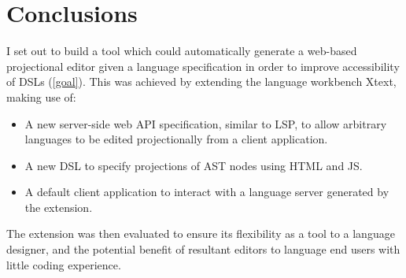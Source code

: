 \documentclass{article}
\begin{document}
{\section{Conclusions}\label{conclusion}
I set out to build a tool which could automatically generate a web-based projectional editor given a language specification in order to improve accessibility of DSLs (\ref{goal}). This was achieved by extending the language workbench Xtext, making use of:
\begin{itemize}
\item A new server-side web API specification, similar to LSP, to allow arbitrary languages to be edited projectionally from a client application.
\item A new DSL to specify projections of AST nodes using HTML and JS.
\item A default client application to interact with a language server generated by the extension.
\end{itemize}
The extension was then evaluated to ensure its flexibility as a tool to a language designer, and the potential benefit of resultant editors to language end users with little coding experience.

}
\end{document}
